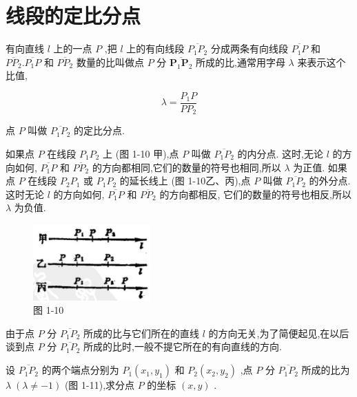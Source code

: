 \documentclass[lang=cn,newtx,10pt,scheme=chinese]{elegantbook}
\begin{document}
\section{线段的定比分点}

\begin{definition}[定比分点] \label{def:int}
	
有向直线 \(l\) 上的一点 \(P\) ,把 \(l\) 上的有向线段 \(\overline{{P}_{1}{P}_{2}}\) 分成两条有向线段 \(\overline{{P}_{1}P}\) 和 \(\overline{P{P}_{2}}.\overline{{P}_{1}P}\) 和 \(\overline{P{P}_{2}}\) 数量的比叫做点 \(P\) 分 \(\overline{{\mathbf{P}}_{1}{\mathbf{P}}_{2}}\) 所成的比,通常用字母 \(\lambda\) 来表示这个比值,

\[
  \lambda = \frac{{P}_{1}P}{P{P}_{2}}
\]

点 \(P\) 叫做 \(\overline{{P}_{1}{P}_{2}}\) 的定比分点.
\end{definition}

\begin{corollary}[内外分点]
如果点 \(P\) 在线段 \({P}_{1}{P}_{2}\) 上 (图 1-10 甲),点 \(P\) 叫做 \(\overline{{P}_{1}{P}_{2}}\) 的内分点. 这时,无论 \(l\) 的方向如何, \(\overline{{P}_{1}P}\) 和 \(\overline{P{P}_{2}}\) 的方向都相同,它们的数量的符号也相同,所以 \(\lambda\) 为正值. 如果点 \(P\) 在线段 \({P}_{2}{P}_{1}\) 或 \({P}_{1}{P}_{2}\) 的延长线上 (图 1-10乙、丙),点 \(P\) 叫做 \(\overline{{P}_{1}{P}_{2}}\) 的外分点. 这时无论 \(l\) 的方向如何, \(\overline{{P}_{1}P}\) 和 \(\overline{P{P}_{2}}\) 的方向都相反, 它们的数量的符号也相反,所以 \(\lambda\) 为负值.
\end{corollary}

\begin{figure}[h]
  \centering
  \includegraphics[max width=0.4\textwidth]{images/01912cc2-ffb6-728e-9ae7-b113ff05c64b_12_791347.jpg}
  \caption{图 1-10}
\end{figure}



由于点 \(P\) 分 \(\overline{{P}_{1}{P}_{2}}\) 所成的比与它们所在的直线 \(l\) 的方向无关,为了简便起见,在以后谈到点 \(P\) 分 \(\overline{{P}_{1}{P}_{2}}\) 所成的比时,一般不提它所在的有向直线的方向.

设 \(\overline{{P}_{1}{P}_{2}}\) 的两个端点分别为 \({P}_{1}\left( {{x}_{1},{y}_{1}}\right)\) 和 \({P}_{2}\left( {{x}_{2},{y}_{2}}\right)\) ,点 \(P\) 分 \(\overline{{P}_{1}{P}_{2}}\) 所成的比为 \(\lambda \;\left( {\lambda \neq - 1}\right)\) (图 1-11),求分点 \(P\) 的坐标 \(\left( {x,y}\right)\) .
\end{document}
